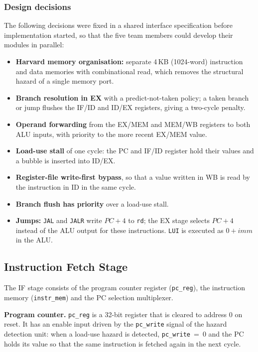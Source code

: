 \subsubsection*{Design decisions}
The following decisions were fixed in a shared interface specification before implementation
started, so that the five team members could develop their modules in parallel:
\begin{itemize}
  \item \textbf{Harvard memory organisation:} separate 4\,KB (1024-word) instruction and data
        memories with combinational read, which removes the structural hazard of a single memory port.
  \item \textbf{Branch resolution in EX} with a predict-not-taken policy; a taken branch or jump
        flushes the IF/ID and ID/EX registers, giving a two-cycle penalty.
  \item \textbf{Operand forwarding} from the EX/MEM and MEM/WB registers to both ALU inputs, with
        priority to the more recent EX/MEM value.
  \item \textbf{Load-use stall} of one cycle: the PC and IF/ID register hold their values and a
        bubble is inserted into ID/EX.
  \item \textbf{Register-file write-first bypass}, so that a value written in WB is read by the
        instruction in ID in the same cycle.
  \item \textbf{Branch flush has priority} over a load-use stall.
  \item \textbf{Jumps:} \texttt{JAL} and \texttt{JALR} write $PC+4$ to \texttt{rd}; the EX stage
        selects $PC+4$ instead of the ALU output for these instructions. \texttt{LUI} is executed as
        $0 + imm$ in the ALU.
\end{itemize}

\subsection{Instruction Fetch Stage}

The IF stage consists of the program counter register (\texttt{pc\_reg}), the instruction memory
(\texttt{instr\_mem}) and the PC selection multiplexer.

\textbf{Program counter.} \texttt{pc\_reg} is a 32-bit register that is cleared to address 0 on
reset. It has an enable input driven by the \texttt{pc\_write} signal of the hazard detection unit:
when a load-use hazard is detected, \texttt{pc\_write}~=~0 and the PC holds its value so that the
same instruction is fetched again in the next cycle.

